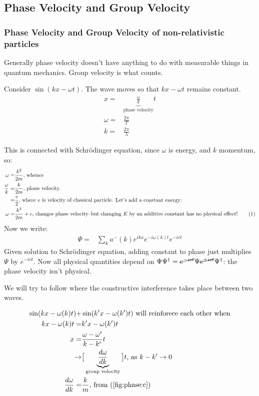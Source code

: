 \documentclass[]{article}
\newcommand\numberthis{\addtocounter{equation}{1}\tag{\theequation}}
\begin{document}
\subsection{Phase Velocity and Group Velocity}\label{section:phase:group:velocities}

\subsubsection{Phase Velocity and Group Velocity of non-relativistic particles}
Generally phase velocity doesn't have anything to do with measurable things in quantum mechanics. Group velocity is what counts.

Consider $\sin(kx-\omega t)$. The wave moves so that $kx-\omega t$ remains constant.
\begin{align*}
x =& \underbrace{\frac{\omega}{k}}_\text{phase velocity} t\\
\omega =& \frac{2 \pi}{T}\\
k =& \frac{2 \pi}{\lambda}
\end{align*}

This is connected with Schr\"odinger equation, since $\omega$ is energy, and $k$ momentum, so:
\begin{align*}
\omega=&\frac{k^2}{2m} \text{, whence}\\
\frac{\omega}{k}=&\frac{k}{2m} \text{, phase velocity.}\\
=& \frac{v}{2}  \text{, where $v$ is velocity of classical particle. Let's add a constant energy:}\\
\omega=&\frac{k^2}{2m}+c \text{, changes phase velocity--but changing $E$ by an additive constant has no physical effect!} \numberthis \label{fig:phase:c}
\end{align*}
Now we write:
\begin{align*}
	\Psi =& \sum_k a^-(k) e^{ikx}e^{- i \omega(k) t} e^{-i c t}
\end{align*}
Given solution to Schr\"odinger equation, adding constant to phase just multiplies $\Psi$ by $e^{-i c t}$. Now all physical quantities depend on $\Psi\Psi^\dagger=\cancel{e^{-i c t}}\Psi \cancel{e^{+i c t}}\Psi^\dagger$: the phase velocity isn't physical.

We will try to follow where the constructive interference takes place between two waves.

\begin{align*}
	\sin(kx-\omega(k)t) +& \sin(k^\prime x-\omega(k^\prime)t)\text{ will reinforece each other when}\\
	kx-\omega(k)t=&k^\prime x-\omega(k^\prime)t\\
	x =& \frac{\omega-\omega^\prime}{k-k^\prime}t\\
	\rightarrow & \big[\underbrace{\frac{d \omega}{dk}}_\text{group velocity}\big] t \text{, as $k-k^\prime \rightarrow 0$}\\
	\frac{d \omega}{dk}=&\frac{k}{m} \text{, from (\ref{fig:phase:c})}
\end{align*}
\end{document}
